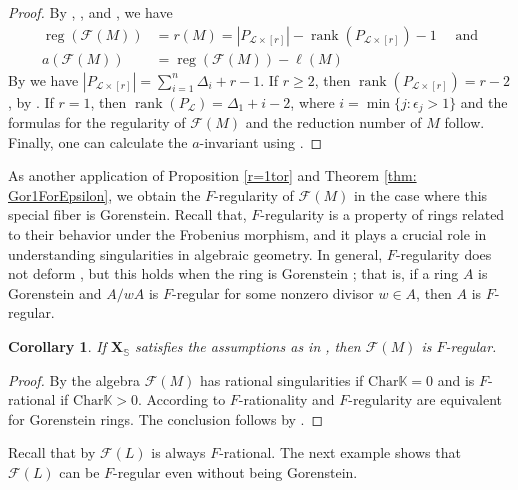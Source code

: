 \documentclass[11pt,a4paper,reqno,dvipsnames]{amsart}
\theoremstyle{plain}
\newtheorem{Corollary}[Theorem]{Corollary}
\theoremstyle{definition}
\newtheorem{Assumptions and Discussion}[Theorem]{Assumptions and Discussion}
\theoremstyle{remark}
\def\KK{{\mathbb K}}
\newcommand\bfX{\mathbf{X}}
\newcommand\bfS{\mathbb{S}}
\newcommand\calF{\mathcal{F}}
\newcommand\calL{\mathcal{L}}
\newcommand{\rank}{\operatorname{rank}}
\def\reg{\operatorname{reg}}
\newcommand{\Lr}{\ensuremath{\calL\times[r]}}
\begin{document}
\begin{proof}
By \cite[Theorem 6.42]{HerHiOh}, \cite[Corollary 2.14, 4.24]{CFGLLLM}, and \cite[Proposition~2.6]{CFGLLLM}, we have  
\begin{align*}
\reg (\calF(M))&=r(M)=|P_{\calL\times [r]}|-\rank(P_{\calL \times [r]})-1 \quad \mbox{ and}\\
a(\calF(M))&=\reg (\calF(M))-\ell(M)
\end{align*}
By \cite[Corollary~4.24]{CFGLLLM} we have $|P_{\Lr}|=\sum_{i=1}^{n}\Delta_i+r-1$. If $r\ge 2$, then $\rank(P_{\calL \times [r]})=r-2$, by . If $r=1$, then $\rank(P_{\calL})=\Delta_1+i-2$, where  $i=\min\{j: \epsilon_j>1\}$ and the formulas for the regularity of $\calF(M)$ and the reduction number of $M$ follow. Finally, one can calculate the $a$-invariant using \cite[Theorem~3.4]{CFGLLLM}. 
\end{proof}



As another application of Proposition \ref{r=1tor} and Theorem \ref{thm: Gor1ForEpsilon}, we obtain the $F$-regularity of $\calF(M)$ in the case where this special fiber is Gorenstein. Recall that, $F$-regularity is a property of rings related to their behavior under the Frobenius morphism, and it plays a crucial role in understanding singularities in algebraic geometry. In general, $F$-regularity does not deform \cite{Si99}, but this holds when the ring is Gorenstein \cite[Corollary~4.7(c)]{HH94}; that is, if a ring $A$ is Gorenstein and $A / wA$ is $F$-regular for some nonzero divisor $w \in A$, then $A$ is $F$-regular.


\begin{Corollary}\label{FRegular}
  If $\bfX_{\bfS}$ satisfies the assumptions as in ,  then $\calF(M)$ is $F$-regular.
\end{Corollary}
\begin{proof}
    By \cite [Corollary 5.7]{LinShenLadder} the algebra $\calF(M)$ has rational singularities if $\mathrm{Char} \KK =0$ and is $F$-rational if $\mathrm{Char} \KK >0$. According to \cite[Corollary 4.7 (a)]{HH94} $F$-rationality and $F$-regularity are equivalent for Gorenstein rings. The conclusion follows by .
\end{proof}

Recall that by \cite[Theorem~4.15]{LinShenLadder} $\calF(L)$ is always $F$-rational. The next example shows that $\calF(L)$ can be $F$-regular even without being Gorenstein. 
\end{document}
